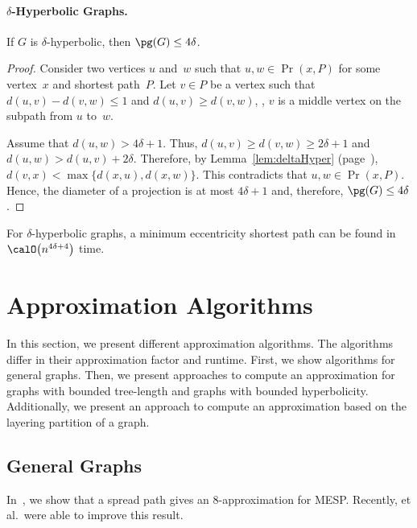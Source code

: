 \paragraph{$\delta$-Hyperbolic Graphs.}

\begin{lemma}
If \( G \) is \( \delta \)-hyperbolic, then \( \pg(G) \leq 4 \delta \).
\end{lemma}

\begin{proof}
Consider two vertices $u$ and~$w$ such that $u,w \in \Pr(x, P)$ for some vertex~$x$ and shortest path~$P$.
Let $v \in P$ be a vertex such that $d(u, v) - d(v, w) \leq 1$ and $d(u, v) \geq d(v, w)$, \ie, $v$ is a middle vertex on the subpath from $u$ to~$w$.

Assume that $d(u, w) > 4\delta + 1$.
Thus, $d(u, v) \geq d(v, w) \geq 2\delta + 1$ and $d(u, w) > d(u, v) + 2\delta$.
Therefore, by Lemma~\ref{lem:deltaHyper} (page~\pageref{lem:deltaHyper}), $d(v, x) < \max \{ d(x, u), d(x, w) \}$.
This contradicts that $u,w \in \Pr(x, P)$.
Hence, the diameter of a projection is at most $4 \delta + 1$ and, therefore, $\pg(G) \leq 4 \delta$.
\end{proof}

\begin{corollary}
For \( \delta \)-hyperbolic graphs, a minimum eccentricity shortest path can be found in \( \calO \big( n^{4\delta+4} \big) \) time.
\end{corollary}


\section{Approximation Algorithms}
    \label{sec:mespApprox}

In this section, we present different approximation algorithms.
The algorithms differ in their approximation factor and runtime.
First, we show algorithms for general graphs.
Then, we present approaches to compute an approximation for graphs with bounded tree-length and graphs with bounded hyperbolicity.
Additionally, we present an approach to compute an approximation based on the layering partition of a graph.

\subsection{General Graphs}
    \label{sec:mespGeneralAppr}

In~\cite{DraganLeiter2015}, we show that a spread path gives an $8$-approximation for MESP.
Recently,  et al.\,\cite{BirmDeMoPlan2016} were able to improve this result.

